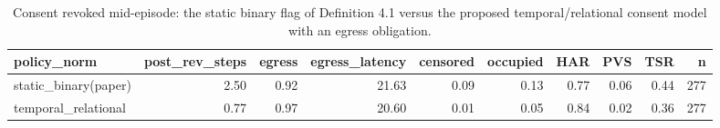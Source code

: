 \begin{table}[t]
\centering
\small
\caption{Consent revoked mid-episode: the static binary flag of Definition 4.1 versus the proposed temporal/relational consent model with an egress obligation.}
\label{tab:e2-revocation}
\begin{tabular}{lrrrrrrrrr}
\toprule
policy\_norm & post\_rev\_steps & egress & egress\_latency & censored & occupied & HAR & PVS & TSR & n \\
\midrule
static\_binary(paper) & 2.50 & 0.92 & 21.63 & 0.09 & 0.13 & 0.77 & 0.06 & 0.44 & 277 \\
temporal\_relational & 0.77 & 0.97 & 20.60 & 0.01 & 0.05 & 0.84 & 0.02 & 0.36 & 277 \\
\bottomrule
\end{tabular}
\end{table}
